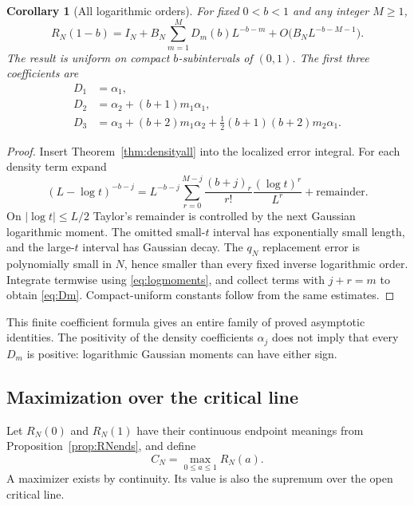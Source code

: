 \documentclass[11pt]{article}
\numberwithin{equation}{section}
\newtheorem{corollary}[theorem]{Corollary}
\theoremstyle{definition}\newtheorem{definition}[theorem]{Definition}
\theoremstyle{remark}\newtheorem{remark}[theorem]{Remark}
\begin{document}
\begin{corollary}[All logarithmic orders]\label{cor:allEuler}
For fixed $0<b<1$ and any integer $M\ge1$,
\begin{equation}\label{eq:allEuler}
 R_N(1-b)=I_N+B_N\sum_{m=1}^M D_m(b)L^{-b-m}
                     +O\bigl(B_NL^{-b-M-1}\bigr).
\end{equation}
The result is uniform on compact $b$-subintervals of $(0,1)$.
The first three coefficients are
\begin{align*}
 D_1&=\alpha_1,\\
 D_2&=\alpha_2+(b+1)m_1\alpha_1,\\
 D_3&=\alpha_3+(b+2)m_1\alpha_2
                +\tfrac12(b+1)(b+2)m_2\alpha_1.
\end{align*}
\end{corollary}
\begin{proof}
Insert Theorem~\ref{thm:densityall} into the localized error integral.
For each density term expand
\[
 (L-\log t)^{-b-j}
 =L^{-b-j}\sum_{r=0}^{M-j}
 \frac{(b+j)_r}{r!}\frac{(\log t)^r}{L^r}
 +\text{remainder}.
\]
On $|\log t|\le L/2$ Taylor's remainder is controlled by the next
Gaussian logarithmic moment. The omitted small-$t$ interval has
exponentially small length, and the large-$t$ interval has Gaussian
decay. The $q_N$ replacement error is polynomially small in $N$, hence
smaller than every fixed inverse logarithmic order. Integrate termwise
using \eqref{eq:logmoments}, and collect terms with $j+r=m$ to obtain
\eqref{eq:Dm}. Compact-uniform constants follow from the same estimates.
\end{proof}

This finite coefficient formula gives an entire family of proved
asymptotic identities. The positivity of the density coefficients
$\alpha_j$ does not imply that every $D_m$ is positive: logarithmic
Gaussian moments can have either sign.

\subsection{Maximization over the critical line}
Let $R_N(0)$ and $R_N(1)$ have their continuous endpoint meanings from
Proposition~\ref{prop:RNends}, and define
\begin{equation}\label{eq:CN}
 C_N=\max_{0\le a\le1}R_N(a).
\end{equation}
A maximizer exists by continuity. Its value is also the supremum over
the open critical line.
\end{document}
